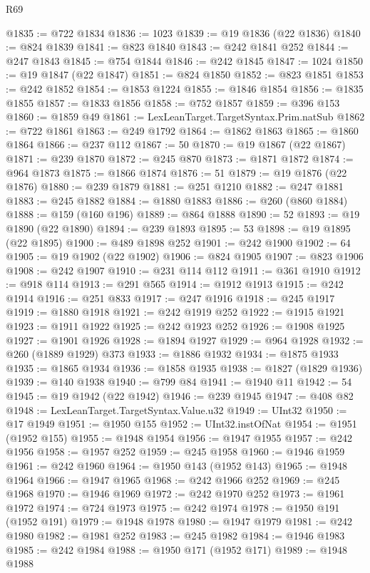 \begin{lexlean}{R69}
\begin{coremodule}
{@1835 := @722 @1834
@1836 := 1023
@1839 := @19 @1836 (@22 @1836)
@1840 := @824 @1839
@1841 := @823 @1840
@1843 := @242 @1841 @252
@1844 := @247 @1843
@1845 := @754 @1844
@1846 := @242 @1845
@1847 := 1024
@1850 := @19 @1847 (@22 @1847)
@1851 := @824 @1850
@1852 := @823 @1851
@1853 := @242 @1852
@1854 := @1853 @1224
@1855 := @1846 @1854
@1856 := @1835 @1855
@1857 := @1833 @1856
@1858 := @752 @1857
@1859 := @396 @153
@1860 := @1859 @49
@1861 := LexLeanTarget.TargetSyntax.Prim.natSub
@1862 := @722 @1861
@1863 := @249 @1792
@1864 := @1862 @1863
@1865 := @1860 @1864
@1866 := @237 @112
@1867 := 50
@1870 := @19 @1867 (@22 @1867)
@1871 := @239 @1870
@1872 := @245 @870
@1873 := @1871 @1872
@1874 := @964 @1873
@1875 := @1866 @1874
@1876 := 51
@1879 := @19 @1876 (@22 @1876)
@1880 := @239 @1879
@1881 := @251 @1210
@1882 := @247 @1881
@1883 := @245 @1882
@1884 := @1880 @1883
@1886 := @260 (@860 @1884)
@1888 := @159 (@160 @196)
@1889 := @864 @1888
@1890 := 52
@1893 := @19 @1890 (@22 @1890)
@1894 := @239 @1893
@1895 := 53
@1898 := @19 @1895 (@22 @1895)
@1900 := @489 @1898 @252
@1901 := @242 @1900
@1902 := 64
@1905 := @19 @1902 (@22 @1902)
@1906 := @824 @1905
@1907 := @823 @1906
@1908 := @242 @1907
@1910 := @231 @114 @112
@1911 := @361 @1910
@1912 := @918 @114
@1913 := @291 @565
@1914 := @1912 @1913
@1915 := @242 @1914
@1916 := @251 @833
@1917 := @247 @1916
@1918 := @245 @1917
@1919 := @1880 @1918
@1921 := @242 @1919 @252
@1922 := @1915 @1921
@1923 := @1911 @1922
@1925 := @242 @1923 @252
@1926 := @1908 @1925
@1927 := @1901 @1926
@1928 := @1894 @1927
@1929 := @964 @1928
@1932 := @260 (@1889 @1929) @373
@1933 := @1886 @1932
@1934 := @1875 @1933
@1935 := @1865 @1934
@1936 := @1858 @1935
@1938 := @1827 (@1829 @1936)
@1939 := @140 @1938
@1940 := @799 @84
@1941 := @1940 @11
@1942 := 54
@1945 := @19 @1942 (@22 @1942)
@1946 := @239 @1945
@1947 := @408 @82
@1948 := LexLeanTarget.TargetSyntax.Value.u32
@1949 := UInt32
@1950 := @17 @1949
@1951 := @1950 @155
@1952 := UInt32.instOfNat
@1954 := @1951 (@1952 @155)
@1955 := @1948 @1954
@1956 := @1947 @1955
@1957 := @242 @1956
@1958 := @1957 @252
@1959 := @245 @1958
@1960 := @1946 @1959
@1961 := @242 @1960
@1964 := @1950 @143 (@1952 @143)
@1965 := @1948 @1964
@1966 := @1947 @1965
@1968 := @242 @1966 @252
@1969 := @245 @1968
@1970 := @1946 @1969
@1972 := @242 @1970 @252
@1973 := @1961 @1972
@1974 := @724 @1973
@1975 := @242 @1974
@1978 := @1950 @191 (@1952 @191)
@1979 := @1948 @1978
@1980 := @1947 @1979
@1981 := @242 @1980
@1982 := @1981 @252
@1983 := @245 @1982
@1984 := @1946 @1983
@1985 := @242 @1984
@1988 := @1950 @171 (@1952 @171)
@1989 := @1948 @1988
}
\end{coremodule}
\end{lexlean}
